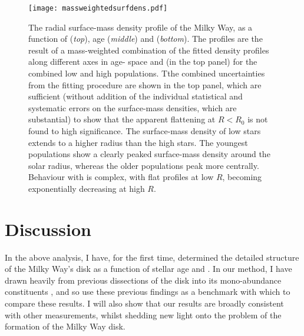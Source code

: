 \begin{figure}
 	\texttt{[image: massweightedsurfdens.pdf]}
 	\centering
     \caption[The best fit model for the true radial surface density profile of the Milky Way, as a function of age, \feh{} and \afe{} using mono-age mono-\feh{} populations in APOGEE DR12]{The radial surface-mass density profile of the Milky Way, as a function of \afe{} (\emph{top}), age (\emph{middle}) and \feh{} (\emph{bottom}). The profiles are the result of a mass-weighted combination of the fitted density profiles along different axes in age-\feh{} space and (in the top panel) for the combined low and high \afe{} populations. Tthe combined uncertainties from the fitting procedure are shown in the top panel, which are sufficient (without addition of the individual statistical and systematic errors on the surface-mass densities, which are substantial) to show that the apparent flattening at $R < R_0$ is not found to high significance. The surface-mass density of low \afe{} stars extends to a higher radius than the high \afe{} stars. The youngest populations show a clearly peaked surface-mass density around the solar radius, whereas the older populations peak more centrally. Behaviour with \feh{} is complex, with flat profiles at low $R$, becoming exponentially decreasing at high $R$.}
    \label{fig:profcombo}
 \end{figure}

 \section{Discussion}
 \label{sec:discussiona}
 In the above analysis, I have, for the first time, determined the detailed structure of the Milky Way's disk as a function of stellar age and \feh{}. In our method, I have drawn heavily from previous dissections of the disk into its mono-abundance constituents \citep[MAPs;][]{2012ApJ...753..148B,2016ApJ...823...30B}, and so use these previous findings as a benchmark with which to compare these results. I will also show that our results are broadly consistent with other measurements, whilst shedding new light onto the problem of the formation of the Milky Way disk.


